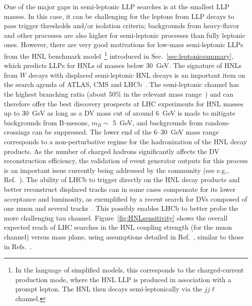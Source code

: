 One of the major gaps in semi-leptonic LLP searches is at the smallest LLP masses. In this case, it can be challenging for the leptons from LLP decays to pass trigger thresholds and/or isolation criteria; backgrounds from heavy-flavor and other processes are also higher for semi-leptonic processes than fully leptonic ones. However, there are very good motivations for low-mass semi-leptonic LLPs from the HNL benchmark model~\footnote{In the language of simplified models, this corresponds to the charged-current production mode, where the HNL LLP is produced in association with a prompt lepton. The HNL then decays semi-leptonically via the $jj\ell$ channel.} introduced in Sec.~\ref{sec:leptonicsummary}, which predicts LLPs for HNLs of masses below 30~GeV. The signature of HNLs from $W$ decays with displaced semi-leptonic HNL decays is an important item on the search agenda of ATLAS, CMS and LHCb~\cite{Helo2014,Izaguirre2015,Mermod2017,Antusch2017,Nemevsek:2018bbt,Cottin:2018kmq}. The semi-leptonic channel has the highest branching ratio (about 50\% in the relevant mass range~\cite{Gronau1984}) and can therefore offer the best discovery prospects at LHC experiments for HNL masses up to 30~GeV as long as a DV mass cut of around 6~GeV is made to mitigate backgrounds from B-mesons, $m_B \sim$ 5~GeV, and backgrounds from random-crossings can be suppressed. The lower end of the 6--30~GeV mass range corresponds to a non-perturbative regime for the hadronization of the HNL decay products. As the number of charged hadrons significantly affects the DV reconstruction efficiency, the validation of event generator outputs for this process is an important issue currently being addressed by the community (see e.g., Ref.~\cite{Cottin:2018kmq}). The ability of LHCb to trigger directly on the HNL decay products and better reconstruct displaced tracks can in some cases compensate for its lower acceptance and luminosity, as exemplified by a recent search for DVs composed of one muon and several tracks~\cite{LHCb2017,Antusch2017}. This possibly enables LHCb to better probe the more challenging tau channel. Figure~\ref{fig:HNLsensitivity} shows the overall expected reach of LHC searches in the HNL coupling strength (for the muon channel) versus mass plane, using assumptions detailed in Ref.~\cite{Mermod2017}, similar to those in Refs.~\cite{Helo2014,Izaguirre2015}.

